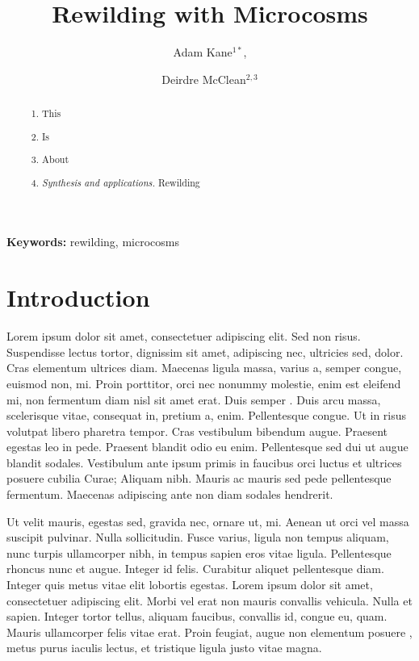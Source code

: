 \documentclass[a4paper,12pt]{article}
\title{Rewilding with Microcosms}
\author{Adam Kane$^{1*}$, \and Deirdre McClean$^{2,3}$}
\begin{document}
\maketitle


\begin{abstract}
  \noindent \begin{enumerate}
  \item This
  \item Is
  \item About
  \item \emph{Synthesis and applications.} Rewilding 
  \end{enumerate}
\end{abstract}

\noindent \textbf{Keywords:} rewilding, microcosms



\newpage


\section*{Introduction}

\citep{kane2016body} Lorem ipsum dolor sit amet, consectetuer adipiscing elit. Sed non risus. Suspendisse
lectus tortor, dignissim sit amet, adipiscing nec, ultricies sed, dolor. Cras elementum
ultrices diam. Maecenas ligula massa, varius a, semper congue, euismod non, mi. Proin
porttitor, orci nec nonummy molestie, enim est eleifend mi, non fermentum diam nisl sit
amet erat. Duis semper . Duis arcu massa, scelerisque
vitae, consequat in, pretium a, enim. Pellentesque congue. Ut in risus volutpat libero
pharetra tempor. Cras vestibulum bibendum augue. Praesent egestas leo in pede. Praesent
blandit odio eu enim. Pellentesque sed dui ut augue blandit sodales. Vestibulum ante ipsum
primis in faucibus orci luctus et ultrices posuere cubilia Curae; Aliquam nibh. Mauris ac
mauris sed pede pellentesque fermentum. Maecenas adipiscing ante non diam sodales
hendrerit.

Ut velit mauris, egestas sed, gravida nec, ornare ut, mi. Aenean ut orci vel massa
suscipit pulvinar. Nulla sollicitudin. Fusce varius, ligula non tempus aliquam, nunc
turpis ullamcorper nibh, in tempus sapien eros vitae ligula. Pellentesque rhoncus nunc et
augue. Integer id felis. Curabitur aliquet pellentesque diam. Integer quis metus vitae
elit lobortis egestas. Lorem ipsum dolor sit amet, consectetuer adipiscing elit. Morbi vel
erat non mauris convallis vehicula. Nulla et sapien. Integer tortor tellus, aliquam
faucibus, convallis id, congue eu, quam. Mauris ullamcorper felis vitae erat. Proin
feugiat, augue non elementum posuere , metus purus iaculis lectus,
et tristique ligula justo vitae magna.
\end{document}
